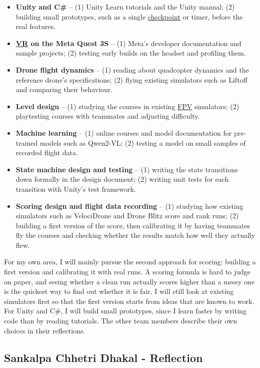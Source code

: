 \documentclass[12pt]{article}
\begin{document}
\begin{itemize}
\item \textbf{Unity and C\#} -- (1) Unity Learn tutorials and the Unity
manual; (2) building small prototypes, such as a single \hyperlink{glos:Checkpoint}{checkpoint} or timer,
before the real features.
\item \textbf{\hyperlink{glos:VR}{VR} on the Meta Quest 3S} -- (1) Meta's developer documentation and
sample projects; (2) testing early builds on the headset and profiling them.
\item \textbf{Drone flight dynamics} -- (1) reading about quadcopter dynamics
and the reference drone's specifications; (2) flying existing simulators such
as Liftoff and comparing their behaviour.
\item \textbf{Level design} -- (1) studying the courses in existing \hyperlink{glos:FPV}{FPV}
simulators; (2) playtesting courses with teammates and adjusting difficulty.
\item \textbf{Machine learning} -- (1) online courses and model documentation
for pre-trained models such as Qwen2-VL; (2) testing a model on small samples
of recorded flight data.
\item \textbf{State machine design and testing} -- (1) writing the state
transitions down formally in the design document; (2) writing unit tests for
each transition with Unity's test framework.
\item \textbf{Scoring design and flight data recording} -- (1) studying how
existing simulators such as VelociDrone and Drone Blitz score and rank runs;
(2) building a first version of the score, then calibrating it by having
teammates fly the courses and checking whether the results match how well
they actually flew.
\end{itemize}

For my own area, I will mainly pursue the second approach for scoring:
building a first version and calibrating it with real runs. A scoring formula
is hard to judge on paper, and seeing whether a clean run actually scores
higher than a messy one is the quickest way to find out whether it is fair.
I will still look at existing simulators first so that the first version
starts from ideas that are known to work. For Unity and C\#, I will build
small prototypes, since I learn faster by writing code than by reading
tutorials. The other team members describe their own choices in their
reflections.


\clearpage
\subsection*{Sankalpa Chhetri Dhakal - Reflection}
\end{document}
